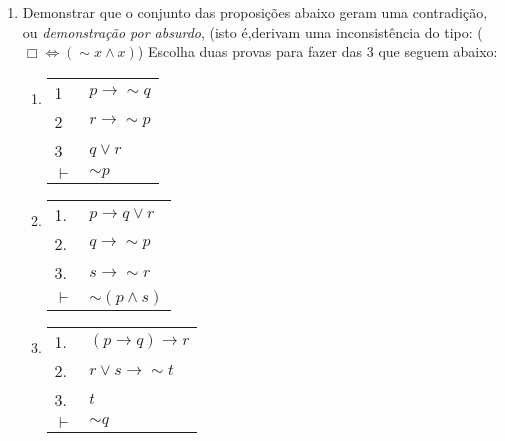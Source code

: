 \documentclass[12pt, a4paper,final]{article}
\begin{document}
\begin{enumerate}
\item Demonstrar que o conjunto das proposi\c c\~oes abaixo geram uma contradi\c c\~ao, ou
 {\em demonstra\c c\~ao por absurdo},  (isto \'e,derivam uma inconsist\^encia do tipo: ($\Box \Leftrightarrow (\sim x \wedge x)$)
Escolha duas provas para fazer das 3 que seguem  abaixo:

\begin{enumerate}
\setlength{\itemsep}{-4pt}
\item 
\vskip 11pt
\begin{tabular}{ll}  
  1 &  $p \rightarrow \sim q $ \\  
  2 &  $ r \rightarrow \sim p$ \\ 
  3 &  $q \vee r$ \\ \hline
  $\vdash $  & $\sim p$   
\end{tabular}

\item 
\vskip 11pt
\begin{tabular}{ll}  %
   1. &  $ p \rightarrow q \vee r $ \\   
    2. &   $ q \rightarrow \sim p$  \\
    3. & $s \rightarrow \sim r $ \\    
    $\vdash $  & $ \sim (p \wedge s)$ 
\end{tabular}

\item 
\vskip 11pt
\begin{tabular}{ll}  %
 1. &  $(p \rightarrow q) \rightarrow r $ \\   
  2. &  $ r \vee s \rightarrow \sim t $ \\    
  3. &  $t$ \\   \hline
     $\vdash $ & $ \sim q $   
     \end{tabular}
\end{enumerate}

\end{enumerate}
\end{document}
